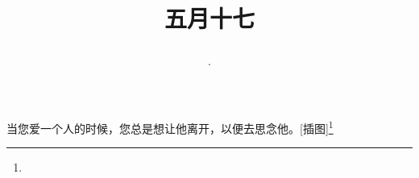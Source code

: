 \title{\date[d=22,m=6,y=2024][year:cn-y,年,month:cn,day:cn,日,·,weekday]·五月十七 }
当您爱一个人的时候，您总是想让他离开，以便去思念他。[插图]\footnote{ }

